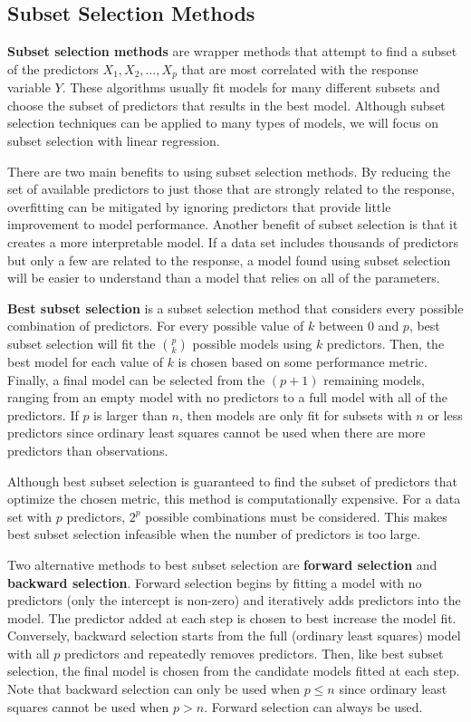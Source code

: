 \documentclass{article}
\begin{document}
\subsection{Subset Selection Methods}

\textbf{Subset selection methods} are wrapper methods that attempt to find a subset of the predictors $X_1, X_2, \dotsc, X_p$ that are most correlated with the response variable $Y$. These algorithms usually fit models for many different subsets and choose the subset of predictors that results in the best model. Although subset selection techniques can be applied to many types of models, we will focus on subset selection with linear regression.

There are two main benefits to using subset selection methods. By reducing the set of available predictors to just those that are strongly related to the response, overfitting can be mitigated by ignoring predictors that provide little improvement to model performance. Another benefit of subset selection is that it creates a more interpretable model. If a data set includes thousands of predictors but only a few are related to the response, a model found using subset selection will be easier to understand than a model that relies on all of the parameters. 

\textbf{Best subset selection} is a subset selection method that considers every possible combination of predictors. For every possible value of $k$ between 0 and $p$, best subset selection will fit the ${p\choose k}$ possible models using $k$ predictors. Then, the best model for each value of $k$ is chosen based on some performance metric. Finally, a final model can be selected from the $(p + 1)$ remaining models, ranging from an empty model with no predictors to a full model with all of the predictors. If $p$ is larger than $n$, then models are only fit for subsets with $n$ or less predictors since ordinary least squares cannot be used when there are more predictors than observations.

Although best subset selection is guaranteed to find the subset of predictors that optimize the chosen metric, this method is computationally expensive. For a data set with $p$ predictors, $2^p$ possible combinations must be considered. This makes best subset selection infeasible when the number of predictors is too large.

Two alternative methods to best subset selection are \textbf{forward selection} and \textbf{backward selection}. Forward selection begins by fitting a model with no predictors (only the intercept is non-zero) and iteratively adds predictors into the model. The predictor added at each step is chosen to best increase the model fit. Conversely, backward selection starts from the full (ordinary least squares) model with all $p$ predictors and repeatedly removes predictors. Then, like best subset selection, the final model is chosen from the candidate models fitted at each step. Note that backward selection can only be used when $p\leq n$ since ordinary least squares cannot be used when $p>n$. Forward selection can always be used.
\end{document}
